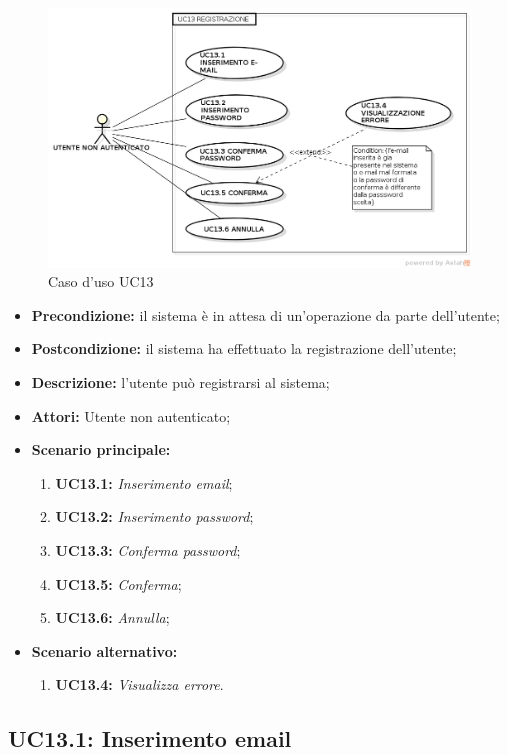 \begin{figure}[H]
	\begin{center}
	\includegraphics[scale=0.4]{diagram/UC13.png}
	\caption{Caso d'uso UC13}
	\end{center}
\end{figure}
\begin{itemize}
	\item \textbf{Precondizione:} il sistema è in attesa di un'operazione da parte dell'utente;
	\item \textbf{Postcondizione:} il sistema ha effettuato la registrazione dell'utente;
	\item \textbf{Descrizione:} l'utente può registrarsi al sistema;
	\item \textbf{Attori:} Utente non autenticato;
	\item \textbf{Scenario principale:}
	\begin{enumerate}
		\item \textbf{ UC13.1:} \textit{ Inserimento email};
		\item \textbf{ UC13.2:} \textit{ Inserimento password};
		\item \textbf{ UC13.3:} \textit{ Conferma password};
		\item \textbf{ UC13.5:} \textit{ Conferma};
		\item \textbf{ UC13.6:} \textit{ Annulla};
	\end{enumerate}
	\item \textbf{Scenario alternativo:}
	\begin{enumerate}
		\item \textbf{ UC13.4:} \textit{ Visualizza errore}.
	\end{enumerate}
\end{itemize}
\subsection{ UC13.1: Inserimento email}

